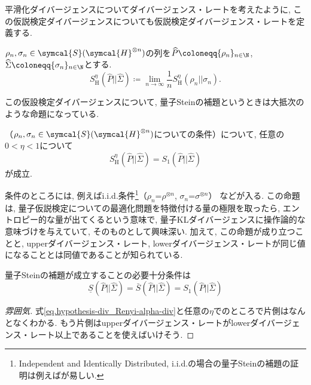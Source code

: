 

平滑化ダイバージェンスについてダイバージェンス・レートを考えたように, この仮説検定ダイバージェンスについても仮説検定ダイバージェンス・レートを定義する. 

\begin{mydfn}
  ${\rho}_n, \sigma_n\in\symcal{S}(\symcal{H}^{\otimes n})$の列を$\widehat{P}\coloneqq \{{\rho}_{n}\}_{n\in\N}$, $\widehat{\Sigma}\coloneqq \{\sigma_{n}\}_{n\in\N}$とする. 
  \begin{equation}
    S_{\text{H}}^{\eta}(\widehat{P}||\widehat{\Sigma})\coloneqq \lim_{n\to\infty}\frac{1}{n}S_{\text{H}}^{\eta}(\rho_n||\sigma_n). 
  \end{equation}
\end{mydfn}

この仮設検定ダイバージェンスについて, 量子Steinの補題というときは大抵次のような命題になっている. 
\begin{myprop}[量子Steinの補題]
  （${\rho}_n, \sigma_n\in\symcal{S}(\symcal{H}^{\otimes n})$についての条件）について, 任意の$0<\eta<1$について
  \begin{equation}
    S_{\text{H}}^{\eta}(\widehat{P}||\widehat{\Sigma})=S_1(\widehat{P}||\widehat{\Sigma})
  \end{equation}
  が成立. 
\end{myprop}
条件のところには, 例えばi.i.d.条件\footnote{Independent and Identically Distributed, i.i.d.の場合の量子Steinの補題の証明は例えば\cite{bjelakovic2012quantumsteinslemmarevisited}が易しい. }（$\rho_n$=$\rho^{\otimes n}$, $\sigma_n$=$\sigma^{\otimes n}$） などが入る. 
この命題は, 量子仮説検定についての最適化問題を特徴付ける量の極限を取ったら, エントロピー的な量が出てくるという意味で, 量子KLダイバージェンスに操作論的な意味づけを与えていて, そのものとして興味深い. 
加えて, この命題が成り立つことと, upperダイバージェンス・レート, lowerダイバージェンス・レートが同じ値になることとは同値であることが知られている. 
\begin{myprop}\label{prop.Stein's_lemma_v.s._AEP}
  量子Steinの補題が成立することの必要十分条件は
  \begin{equation}
    \underline{S}(\widehat{P}||\widehat{\Sigma})=\bar{S}(\widehat{P}||\widehat{\Sigma})=S_1(\widehat{P}||\widehat{\Sigma})
  \end{equation}
\end{myprop}

\begin{proof}[雰囲気]
  式\eqref{eq.hypothesis-div_Renyi-alpha-div}と任意の$\eta$でのところで片側はなんとなくわかる. 
  もう片側はupperダイバージェンス・レートがlowerダイバージェンス・レート以上であることを使えばいけそう. 
\end{proof}


